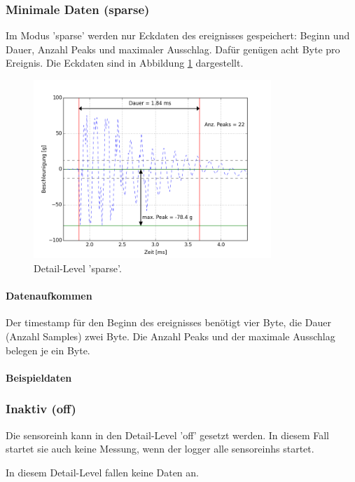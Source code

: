 \subsubsection{Minimale Daten (sparse)}
Im Modus 'sparse' werden nur Eckdaten des \gls{ereignis}ses gespeichert: Beginn und Dauer, Anzahl Peaks und maximaler Ausschlag. Dafür genügen acht Byte pro Ereignis. Die Eckdaten sind in Abbildung \ref{fig.detailsparse} dargestellt.

\begin{figure}
	\centering
		\includegraphics[width=0.8\textwidth]{images/sparse.png}
	\caption{Detail-Level 'sparse'.}
	\label{fig.detailsparse}
\end{figure}

\paragraph{Datenaufkommen} Der \gls{timestamp} für den Beginn des \gls{ereignis}ses benötigt vier Byte, die Dauer (Anzahl Samples) zwei Byte. Die Anzahl Peaks und der maximale Ausschlag belegen je ein Byte.

\paragraph{Beispieldaten} 

\subsubsection{Inaktiv (off)}
Die \gls{sensoreinh} kann in den Detail-Level 'off' gesetzt werden. In diesem Fall startet sie auch keine Messung, wenn der \gls{logger} alle \glspl{sensoreinh} startet.

In diesem Detail-Level fallen keine Daten an.


